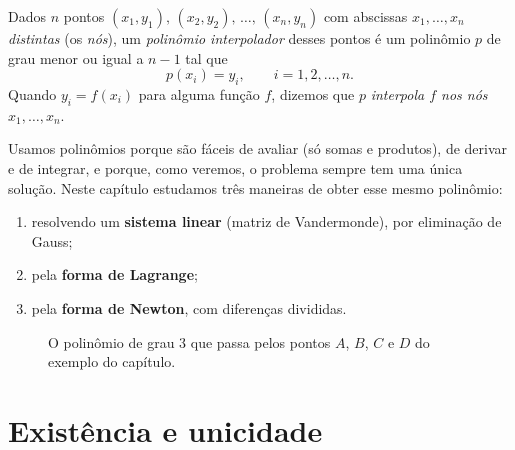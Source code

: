 \begin{definicao}
Dados $n$ pontos $(x_1,y_1),\,(x_2,y_2),\,\dots,\,(x_n,y_n)$ com abscissas
$x_1,\dots,x_n$ \emph{distintas} (os \emph{nós}), um \emph{polinômio interpolador} desses
pontos é um polinômio $p$ de grau menor ou igual a $n-1$ tal que
\[
p(x_i)=y_i,\qquad i=1,2,\dots,n.
\]
Quando $y_i=f(x_i)$ para alguma função $f$, dizemos que $p$ \emph{interpola $f$ nos nós}
$x_1,\dots,x_n$.
\end{definicao}

Usamos polinômios porque são fáceis de avaliar (só somas e produtos), de derivar e de
integrar, e porque, como veremos, o problema sempre tem uma única solução. Neste capítulo
estudamos três maneiras de obter esse mesmo polinômio:
\begin{enumerate}[nosep]
  \item resolvendo um \textbf{sistema linear} (matriz de Vandermonde), por eliminação de Gauss;
  \item pela \textbf{forma de Lagrange};
  \item pela \textbf{forma de Newton}, com diferenças divididas.
\end{enumerate}

\begin{figure}[h]
\centering
{}
\caption{O polinômio de grau 3 que passa pelos pontos $A$, $B$, $C$ e $D$ do exemplo
do capítulo.}
\label{fig:exemplo}
\end{figure}

\section{Existência e unicidade}

